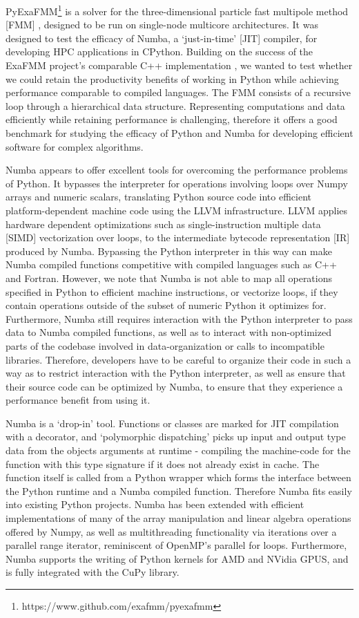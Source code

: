 \documentclass{IEEEcsmag}
\begin{document}
PyExaFMM\footnote{https://www.github.com/exafmm/pyexafmm} is a solver for the three-dimensional particle fast multipole method [FMM] \cite{Greengard1987}, designed to be run on single-node multicore architectures. It was designed to test the efficacy of Numba, a `just-in-time' [JIT] compiler, for developing HPC applications in CPython. Building on the success of the ExaFMM project's comparable C++ implementation \cite{Wang2021}, we wanted to test whether we could retain the productivity benefits of working in Python while achieving performance comparable to compiled languages.  The FMM consists of a recursive loop through a hierarchical data structure. Representing computations and data efficiently while retaining performance is challenging, therefore it offers a good benchmark for studying the efficacy of Python and Numba for developing efficient software for complex algorithms.

Numba appears to offer excellent tools for overcoming the performance problems of Python. It bypasses the interpreter for operations involving loops over Numpy arrays and numeric scalars, translating Python source code into efficient platform-dependent machine code using the LLVM infrastructure. LLVM applies hardware dependent optimizations such as single-instruction multiple data [SIMD] vectorization over loops, to the intermediate bytecode representation [IR] produced by Numba. Bypassing the Python interpreter in this way can make Numba compiled functions competitive with compiled languages such as C++ and Fortran. However, we note that Numba is not able to map all operations specified in Python to efficient machine instructions, or vectorize loops, if they contain operations outside of the subset of numeric Python it optimizes for. Furthermore, Numba still requires interaction with the Python interpreter to pass data to Numba compiled functions, as well as to interact with non-optimized parts of the codebase involved in data-organization or calls to incompatible libraries. Therefore, developers have to be careful to organize their code in such a way as to restrict interaction with the Python interpreter, as well as ensure that their source code can be optimized by Numba, to ensure that they experience a performance benefit from using it.

Numba is a `drop-in' tool. Functions or classes are marked for JIT compilation with a decorator, and `polymorphic dispatching' picks up input and output type data from the objects arguments at runtime - compiling the machine-code for the function with this type signature if it does not already exist in cache. The function itself is called from a Python wrapper which forms the interface between the Python runtime and a Numba compiled function. Therefore Numba fits easily into existing Python projects. Numba has been extended with efficient implementations of many of the array manipulation and linear algebra operations offered by Numpy, as well as multithreading functionality via iterations over a parallel range iterator, reminiscent of OpenMP's parallel for loops. Furthermore, Numba supports the writing of Python kernels for AMD and NVidia GPUS, and is fully integrated with the CuPy library.
\end{document}
